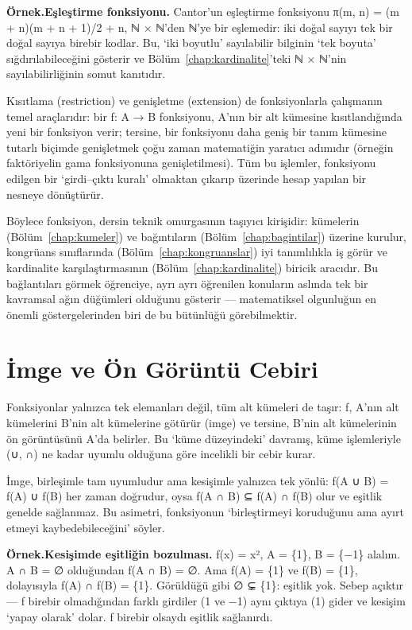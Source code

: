 \begin{tcolorbox}[bookbox,colback=cEx]\textbf{\textsf{\textcolor{cAcc}{Örnek.}}}\quad \textbf{Eşleştirme fonksiyonu. }Cantor’un eşleştirme fonksiyonu π(m, n) = (m + n)(m + n + 1)/2 + n, ℕ × ℕ’den ℕ’ye bir eşlemedir: iki doğal sayıyı tek bir doğal sayıya birebir kodlar. Bu, ‘iki boyutlu’ sayılabilir bilginin ‘tek boyuta’ sığdırılabileceğini gösterir ve Bölüm~\ref{chap:kardinalite}’teki ℕ × ℕ’nin sayılabilirliğinin somut kanıtıdır.\end{tcolorbox}

Kısıtlama (restriction) ve genişletme (extension) de fonksiyonlarla çalışmanın temel araçlarıdır: bir f: A → B fonksiyonu, A’nın bir alt kümesine kısıtlandığında yeni bir fonksiyon verir; tersine, bir fonksiyonu daha geniş bir tanım kümesine tutarlı biçimde genişletmek çoğu zaman matematiğin yaratıcı adımıdır (örneğin faktöriyelin gama fonksiyonuna genişletilmesi). Tüm bu işlemler, fonksiyonu edilgen bir ‘girdi–çıktı kuralı’ olmaktan çıkarıp üzerinde hesap yapılan bir nesneye dönüştürür.

Böylece fonksiyon, dersin teknik omurgasının taşıyıcı kirişidir: kümelerin (Bölüm~\ref{chap:kumeler}) ve bağıntıların (Bölüm~\ref{chap:bagintilar}) üzerine kurulur, kongrüans sınıflarında (Bölüm~\ref{chap:kongruanslar}) iyi tanımlılıkla iş görür ve kardinalite karşılaştırmasının (Bölüm~\ref{chap:kardinalite}) biricik aracıdır. Bu bağlantıları görmek öğrenciye, ayrı ayrı öğrenilen konuların aslında tek bir kavramsal ağın düğümleri olduğunu gösterir — matematiksel olgunluğun en önemli göstergelerinden biri de bu bütünlüğü görebilmektir.

\section{İmge ve Ön Görüntü Cebiri}

Fonksiyonlar yalnızca tek elemanları değil, tüm alt kümeleri de taşır: f, A’nın alt kümelerini B’nin alt kümelerine götürür (imge) ve tersine, B’nin alt kümelerinin ön görüntüsünü A’da belirler. Bu ‘küme düzeyindeki’ davranış, küme işlemleriyle (∪, ∩) ne kadar uyumlu olduğuna göre incelikli bir cebir kurar.

İmge, birleşimle tam uyumludur ama kesişimle yalnızca tek yönlü: f(A ∪ B) = f(A) ∪ f(B) her zaman doğrudur, oysa f(A ∩ B) ⊆ f(A) ∩ f(B) olur ve eşitlik genelde sağlanmaz. Bu asimetri, fonksiyonun ‘birleştirmeyi koruduğunu ama ayırt etmeyi kaybedebileceğini’ söyler.

\begin{tcolorbox}[bookbox,colback=cEx]\textbf{\textsf{\textcolor{cAcc}{Örnek.}}}\quad \textbf{Kesişimde eşitliğin bozulması. }f(x) = x², A = \{1\}, B = \{−1\} alalım. A ∩ B = ∅ olduğundan f(A ∩ B) = ∅. Ama f(A) = \{1\} ve f(B) = \{1\}, dolayısıyla f(A) ∩ f(B) = \{1\}. Görüldüğü gibi ∅ ⊊ \{1\}: eşitlik yok. Sebep açıktır — f birebir olmadığından farklı girdiler (1 ve −1) aynı çıktıya (1) gider ve kesişim ‘yapay olarak’ dolar. f birebir olsaydı eşitlik sağlanırdı.\end{tcolorbox}

